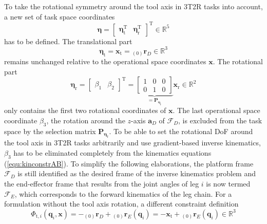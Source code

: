\documentclass[robotics,article,submit,moreauthors,pdftex]{Definitions/mdpi}
\newcommand{\bm}[1]{\boldsymbol{#1}}
\newcommand{\ortvek}[4]{{ }_{(#1)}{\boldsymbol{#2}}^{#3}_{#4} }
\newcommand{\transp}[0]{{\mathrm{T}}}
\newcommand{\ks}[1]{{\mathcal{F}}_{#1}}
\let\Phi\varPhi
\begin{document}
To take the rotational symmetry around the tool axis in 3T2R tasks into account, a new set of task space coordinates
%
\begin{equation}
\bm{\eta}
=
\begin{bmatrix}
\bm{\eta}_{\mathrm{t}}^\transp & 
\bm{\eta}_{\mathrm{r}}^\transp
\end{bmatrix}^\transp
\in {\mathbb{R}}^{5}
\end{equation}
%
has to be defined.
%
The translational part
%
\begin{equation}
\bm{\eta}_{\mathrm{t}}
=
\bm{x}_{\mathrm{t}}
=
\ortvek{0}{r}{}{D}
\in {\mathbb{R}}^{3}
\end{equation}
%
remains unchanged relative to the operational space coordinates $\bm{x}$.
The rotational part
%
\begin{equation}
\bm{\eta}_{\mathrm{r}}
=
\begin{bmatrix}
\beta_1 & \beta_2
\end{bmatrix}^\transp
=
\underbrace{\begin{bmatrix}
    1 & 0 & 0 \\ 
    0 & 1 & 0 \end{bmatrix}}_{=\bm{P}_{\bm{\eta}_\mathrm{r}}}
\bm{x}_{\mathrm{r}}
\in {\mathbb{R}}^{2}
\label{equ:etar_def}
\end{equation}
%
only contains the first two rotational coordinates of $\bm{x}$.
The last operational space coordinate $\beta_3$, the rotation around the $z$-axis $\bm{a}_{D}$ of $\ks{D}$, is excluded from the task space by the selection matrix $\bm{P}_{\bm{\eta}_\mathrm{r}}$.
To be able to set the rotational DoF around the tool axis in 3T2R tasks arbitrarily and use gradient-based inverse kinematics, $\beta_3$ has to be eliminated completely from the kinematics equations (\ref{equ:kinconstrAB}).
%
%
To simplify the following elaborations, the platform frame $\ks{D}$ is still identified as the desired frame of the inverse kinematics problem and the end-effector frame that results from the joint angles of leg $i$ is now termed $\ks{E}$, which corresponds to the forward kinematics of the leg chain.
%
For a formulation without the tool axis rotation, a different constraint definition
%
\begin{equation}
\bm{\Phi}_{\mathrm{t},i}(\bm{q}_i,\bm{x})
= 
- \ortvek{0}{r}{}{D} + \ortvek{0}{r}{}{E}(\bm{q}_i)
=
- \bm{x}_{\mathrm{t}} + \ortvek{0}{r}{}{E}(\bm{q}_i) \in {\mathbb{R}}^{3}
\label{equ:Phit_def_i}
\end{equation}
\end{document}
